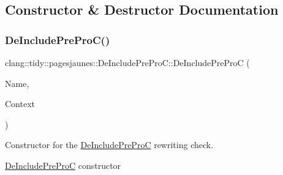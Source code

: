 \subsection{Constructor \& Destructor Documentation}
\mbox{\label{classclang_1_1tidy_1_1pagesjaunes_1_1_de_include_pre_pro_c_ab816dc100fb59f062328b7f8f44905cd}} 
\subsubsection{\texorpdfstring{De\+Include\+Pre\+Pro\+C()}{DeIncludePreProC()}}
{\footnotesize\ttfamily clang\+::tidy\+::pagesjaunes\+::\+De\+Include\+Pre\+Pro\+C\+::\+De\+Include\+Pre\+ProC (\begin{DoxyParamCaption}\item[{String\+Ref}]{Name,  }\item[{Clang\+Tidy\+Context $\ast$}]{Context }\end{DoxyParamCaption})}



Constructor for the {\ttfamily \hyperlink{classclang_1_1tidy_1_1pagesjaunes_1_1_de_include_pre_pro_c}{De\+Include\+Pre\+ProC}} rewriting check. 

\hyperlink{classclang_1_1tidy_1_1pagesjaunes_1_1_de_include_pre_pro_c}{De\+Include\+Pre\+ProC} constructor

